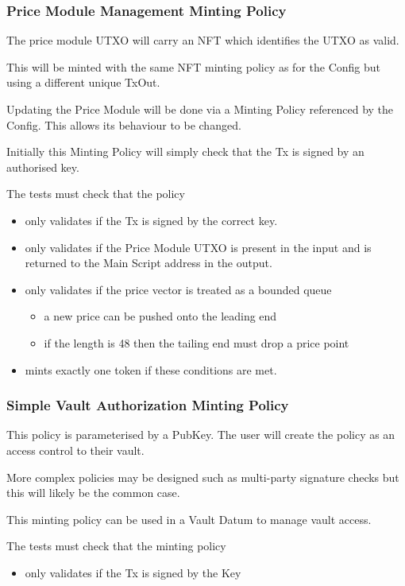 \documentclass{article} %
\begin{document}
\subsubsection{Price Module Management Minting Policy}
The price module UTXO will carry an NFT which identifies the UTXO as valid.

This will be minted with the same NFT minting policy as for the Config but using a different unique TxOut.

Updating the Price Module will be done via a Minting Policy referenced by the Config. This allows its behaviour to be changed.

Initially this Minting Policy will simply check that the Tx is signed by an authorised key.

The tests must check that the policy
\begin{itemize}
  \item only validates if the Tx is signed by the correct key.
  \item only validates if the Price Module UTXO is present in the input and is returned to the Main Script address in the output.
  \item only validates if the price vector is treated as a bounded queue
  \begin{itemize}
    \item a new price can be pushed onto the leading end
    \item if the length is 48 then the tailing end must drop a price point
  \end{itemize}
  \item mints exactly one token if these conditions are met.
\end{itemize}

\subsubsection{Simple Vault Authorization Minting Policy}
This policy is parameterised by a PubKey. The user will create the policy as an access control to their vault.

More complex policies may be designed such as multi-party signature checks but this will likely be the common case.

This minting policy can be used in a Vault Datum to manage vault access.

The tests must check that the minting policy
\begin{itemize}
  \item only validates if the Tx is signed by the Key
\end{itemize}
\end{document}
